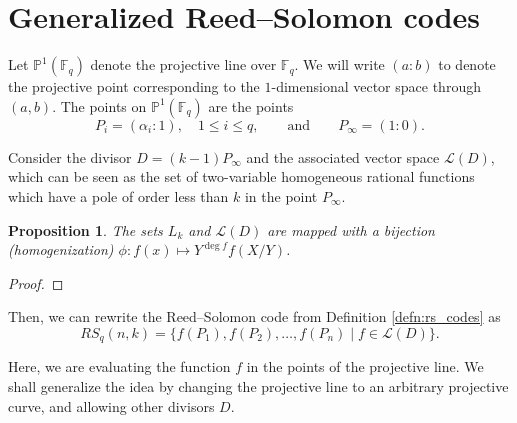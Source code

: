\documentclass[11pt, oneside]{amsart}
\newtheorem{prop}[thm]{Proposition}
\theoremstyle{definition}
\theoremstyle{remark}
\numberwithin{equation}{section}
\begin{document}

\section{Generalized Reed--Solomon codes} \label{s:grs}
Let $\mathbb{P}^1(\mathbb{F}_q)$ denote the projective line over $\mathbb{F}_q$.
We will write $(a : b)$ to denote the projective point corresponding to the $1$-dimensional vector space through $(a, b)$.
The points on $\mathbb{P}^1(\mathbb{F}_q)$ are the points
\begin{equation}
	P_i = (\alpha_i : 1), \quad 1 \le i \le q, \qquad \text{and} \qquad 
	P_\infty = (1 : 0).
\end{equation}

Consider the divisor $D = (k-1)P_\infty$ and the associated vector space $\mathcal L(D)$, which can be seen as the set of two-variable homogeneous rational functions which have a pole of order less than $k$ in the point $P_\infty$.

\begin{prop}
	The sets $L_k$ and $\mathcal L(D)$ are mapped with a bijection (homogenization) $\phi: f(x) \mapsto Y^{\deg f} f(X/Y)$.
\end{prop}
\begin{proof}
\end{proof}

Then, we can rewrite the Reed--Solomon code from Definition \ref{defn:rs_codes} as
\begin{equation}
	RS_q(n, k) = \{f(P_1), f(P_2), \dots, f(P_n) \mid f \in \mathcal L(D)\}.
\end{equation}

Here, we are evaluating the function $f$ in the points of the projective line.
We shall generalize the idea by changing the projective line to an arbitrary projective curve, and allowing other divisors $D$.
\end{document}

